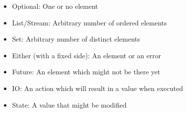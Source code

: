 \begin{itemize}[<+->]
  \item Optional: One or no element
  \item List/Stream: Arbitrary number of ordered elements
  \item Set: Arbitrary number of distinct elements
  \item Either (with a fixed side): An element or an error
  \item Future: An element which might not be there yet
  \item IO: An action which will result in a value when executed
  \item State: A value that might be modified
\end{itemize}
